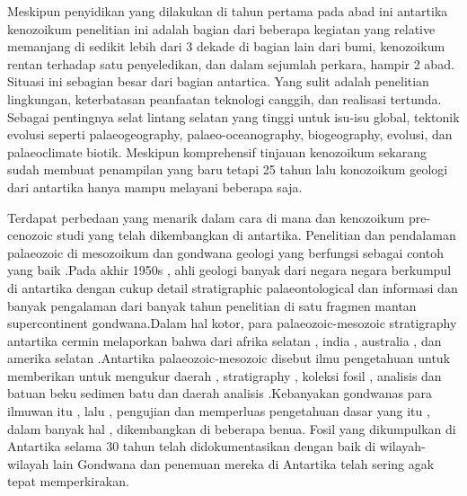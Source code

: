 		Meskipun penyidikan yang dilakukan di tahun pertama pada abad ini antartika kenozoikum penelitian ini adalah bagian dari beberapa kegiatan yang 
	relative memanjang di sedikit lebih dari 3 dekade di bagian lain dari bumi, kenozoikum rentan terhadap satu penyeledikan, dan dalam sejumlah perkara, 
	hampir 2 abad. Situasi ini sebagian besar dari bagian antartica. Yang sulit adalah penelitian lingkungan, keterbatasan peanfaatan teknologi canggih, 
	dan realisasi tertunda. Sebagai pentingnya selat lintang selatan yang tinggi untuk isu-isu global, tektonik evolusi seperti  palaeogeography, 
	palaeo-oceanography, biogeography, evolusi, dan palaeoclimate biotik. Meskipun komprehensif tinjauan kenozoikum sekarang sudah membuat penampilan yang baru 
	tetapi 25 tahun lalu konozoikum geologi dari antartika hanya mampu melayani beberapa saja.
	
		Terdapat perbedaan yang menarik dalam cara di mana dan kenozoikum pre-cenozoic studi yang telah dikembangkan di antartika.
	Penelitian dan pendalaman palaeozoic di mesozoikum dan gondwana  geologi yang berfungsi sebagai contoh yang baik .Pada akhir 1950s , 
	ahli geologi banyak dari negara negara berkumpul di antartika dengan cukup detail stratigraphic palaeontological dan informasi dan banyak pengalaman 
	dari banyak tahun penelitian di satu fragmen mantan supercontinent gondwana.Dalam hal kotor, para palaeozoic-mesozoic stratigraphy antartika 
	cermin melaporkan bahwa dari afrika selatan , india , australia , dan amerika selatan .Antartika palaeozoic-mesozoic disebut ilmu pengetahuan untuk 
	memberikan untuk mengukur daerah , stratigraphy , koleksi fosil , analisis dan batuan beku sedimen batu dan daerah analisis .Kebanyakan gondwanas  
	para ilmuwan itu , lalu , pengujian dan memperluas pengetahuan dasar yang itu , dalam banyak hal , dikembangkan di beberapa benua. 
	Fosil yang dikumpulkan di Antartika selama 30 tahun telah didokumentasikan dengan baik di wilayah-wilayah lain Gondwana dan penemuan mereka di Antartika 
	telah sering agak tepat memperkirakan. 
	
